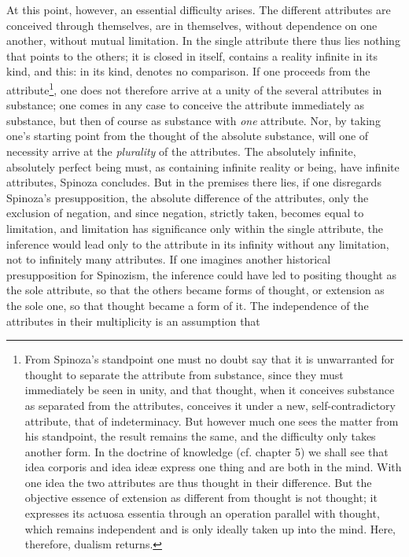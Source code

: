 \documentclass[12pt,a4paper,openany]{book}
\newcommand{\opage}[1]{\marginnote{\footnotesize\textit{[#1]}}}
\begin{document}
At this point, however, an essential difficulty arises. The
different attributes are conceived through themselves, are in themselves, without
dependence on one another, without mutual limitation. In the single
attribute there thus lies nothing that points to the others; it is
closed in itself, contains a reality infinite in its kind, and this: in
its kind, denotes no comparison. If one proceeds from the
attribute\footnote{From Spinoza's standpoint one must no doubt say that it is
unwarranted for thought to separate the attribute from substance, since they
must immediately be seen in unity, and that thought, when it conceives
substance as separated from the attributes, conceives it under a new,
self-contradictory attribute, that of indeterminacy. But however
much one sees the matter from his standpoint, the result remains the same, and
the difficulty only takes another form. In the doctrine of knowledge (cf.
chapter 5) we shall see that idea corporis and idea ideæ express one thing and
are both in the mind. With one idea the two attributes are thus thought in
their difference. But the objective essence of extension as
different from thought is not thought; it expresses its actuosa
essentia through an operation parallel with thought, which remains
independent and is only ideally taken up into the mind. Here, therefore,
dualism returns.}, %
one does not therefore arrive at a unity of the
\opage{51} several attributes in substance; one comes in any case to
conceive the attribute immediately as substance, but then of course as
substance with \emph{one} attribute.
Nor, by taking one's
starting point from the thought of the absolute substance, will one of necessity
arrive at the \emph{plurality} of the attributes. The absolutely infinite, absolutely
perfect being must, as containing infinite reality or being,
have infinite attributes, Spinoza concludes. But in the premises there lies,
if one disregards Spinoza's presupposition, the absolute
difference of the attributes, only the exclusion of negation, and since negation, strictly
taken, becomes equal to limitation, and limitation has significance only
within the single attribute, the inference would lead only to the attribute
in its infinity without any limitation, not to infinitely many
attributes. If one imagines another historical presupposition for
Spinozism, the inference could have led to positing thought as the
sole attribute, so that the others became forms of thought,
or extension as the sole one, so that thought became a form of it.
The independence of the attributes in their multiplicity is an assumption that
\end{document}
